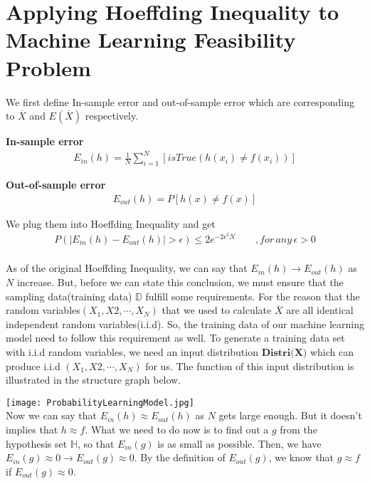 \documentclass[11pt]{article}
\begin{document}
\section{Applying Hoeffding Inequality to Machine Learning Feasibility Problem}
We first define In-sample error and out-of-sample error which are corresponding to $\overline{X}$ and $E(\overline{X})$ respectively.

\textbf{In-sample error}\\
\begin{eqnarray}
\displaystyle{E_{in}(h) = \frac{1}{N} \sum _{i=1}^{N} \left[ isTrue\left( h(x_i) \neq f(x_i) \right) \right]}
\end{eqnarray}

\textbf{Out-of-sample error}\\
\begin{eqnarray}
\displaystyle{E_{out}(h) = P[h(x) \neq f(x)]}
\end{eqnarray}

We plug them into Hoeffding Inequality and get
\begin{eqnarray}
P\left(|E_{in}(h) - E_{out}(h)| > \epsilon\right) \leq 2e^{-2\epsilon^2 N} \qquad, for \, any \, \epsilon > 0
\end{eqnarray}
\\
As of the original Hoeffding Inequality, we can say that $E_{in}(h)\to E_{out}(h)$ as $N$ increase. But, before we can state this conclusion, we must ensure that the sampling data(training data) $\mathbb{D}$ fulfill some requirements. For the reason that the random variables$(X_1, X2, \cdots , X_N)$ that we used to calculate $\overline{X}$ are all identical independent random variables(i.i.d). So, the training data of our machine learning model need to follow this requirement as well. To generate a training data set with i.i.d random variables, we need an input distribution $\textbf{Distri(X)}$ which can produce i.i.d $(X_1, X2, \cdots , X_N)$ for us. The function of this input distribution is illustrated in the structure graph below.

\texttt{[image: ProbabilityLearningModel.jpg]}\\

Now we can say that $E_{in}(h)\approx E_{out}(h)$ as $N$ gets large enough. But it doesn't implies that $h\approx f$. What we need to do now is to find out a $g$ from the hypothesis set $\mathbb{H}$, so that $E_{in}(g)$ is as small as possible. Then, we have $E_{in}(g)\approx 0 \to E_{out}(g)\approx 0$. By the definition of $E_{out}(g)$, we know that $g \approx f$ if $E_{out}(g) \approx 0$.
\end{document}
